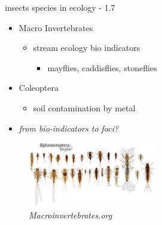 \documentclass[
  ignorenonframetext,
]{beamer}
\providecommand{\tightlist}{%
  \setlength{\itemsep}{0pt}\setlength{\parskip}{0pt}}
\begin{document}
\begin{frame}{insects species in ecology - 1.7}
\protect\hypertarget{insects-species-in-ecology---1.7}{}
\begin{itemize}
\tightlist
\item
  Macro Invertebrates

  \begin{itemize}
  \tightlist
  \item
    stream ecology bio indicators

    \begin{itemize}
    \tightlist
    \item
      mayflies, caddisflies, stoneflies\\
    \end{itemize}
  \end{itemize}
\item
  Coleoptera

  \begin{itemize}
  \tightlist
  \item
    soil contamination by metal
  \end{itemize}
\item
  \emph{from bio-indicators to foci?}
\end{itemize}

\begin{figure}
\centering
\includegraphics[width=0.5\textwidth,height=\textheight]{../graphics/assorted/ephemeroptera.resized.png}
\caption{\emph{Macroinvertebrates.org}}
\end{figure}
\end{frame}
\end{document}
